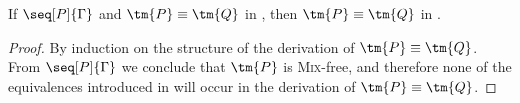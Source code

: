 \begin{theorem}\label{thm:hcp2cp-equiv}
  If $\seq[P]{\Gamma}$ and $\tm{P}\equiv\tm{Q}$ in \hcp, then $\tm{P}\equiv\tm{Q}$ in \cp.
\end{theorem}
\begin{proof}
  By induction on the structure of the derivation of $\tm{P}\equiv\tm{Q}$.
  From $\seq[P]{\Gamma}$ we conclude that $\tm{P}$ is \textsc{Mix}-free, and
  therefore none of the equivalences introduced in \hcp will occur in the
  derivation of $\tm{P}\equiv\tm{Q}$.
\end{proof}